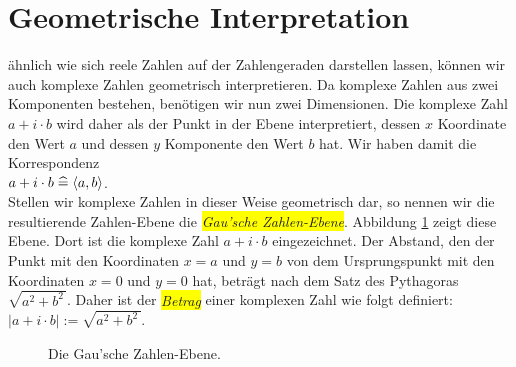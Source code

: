 \section{Geometrische Interpretation}
\"{a}hnlich wie sich reele Zahlen auf der Zahlengeraden darstellen lassen, k\"{o}nnen wir auch komplexe Zahlen
geometrisch interpretieren.  Da komplexe Zahlen aus zwei Komponenten bestehen, ben\"{o}tigen wir nun zwei
Dimensionen.  Die komplexe Zahl $a + i \cdot b$ wird daher als der Punkt in der Ebene interpretiert,
dessen $x$ Koordinate den Wert $a$ und dessen $y$ Komponente den Wert $b$ hat.  Wir haben damit die
Korrespondenz 
\\[0.2cm]
\hspace*{1.3cm}
$a + i \cdot b \;\widehat{=}\; \pair(a,b)$.
\\[0.2cm]
Stellen wir komplexe Zahlen in dieser Weise geometrisch dar, so nennen wir die resultierende Zahlen-Ebene
die \colorbox{yellow}{\emph{Gau\3'sche Zahlen-Ebene}}.  Abbildung \ref{fig:gauss-ebene.eps} zeigt diese Ebene.
Dort ist die komplexe Zahl $a + i \cdot b$ eingezeichnet.  Der Abstand, den der Punkt mit den Koordinaten
$x = a$ und $y = b$ von dem Ursprungspunkt mit den Koordinaten $x = 0$ und $y = 0$ hat, betr\"{a}gt nach dem
Satz des Pythagoras $\sqrt{a^2 + b^2\,}$.  Daher ist der \colorbox{yellow}{\emph{Betrag}} einer komplexen Zahl wie folgt definiert:
\\[0.2cm]
\hspace*{1.3cm}
$|a + i \cdot b| := \sqrt{a^2 + b^2\,}$.


\begin{figure}[!ht]
  \centering
  \caption{Die Gau\3'sche Zahlen-Ebene.}
  \label{fig:gauss-ebene.eps}
\end{figure}

